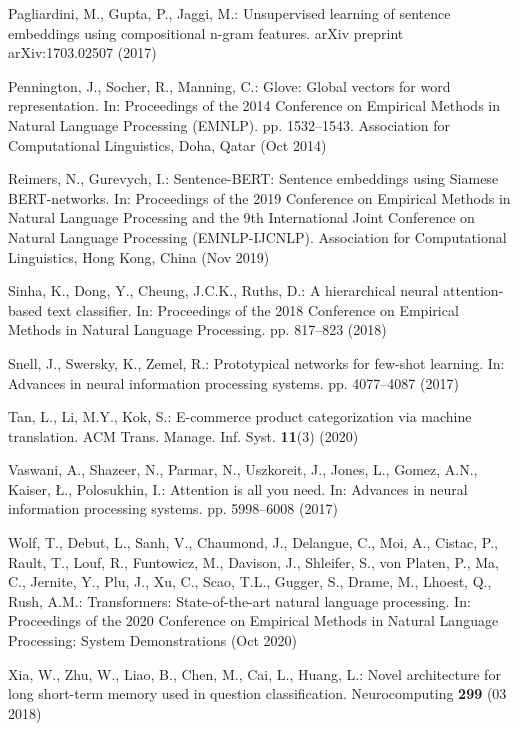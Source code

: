 \documentclass[runningheads, envcountsame, a4paper]{llncs}
\begin{document}
\begin{thebibliography}{10}
Pagliardini, M., Gupta, P., Jaggi, M.: Unsupervised learning of sentence
  embeddings using compositional n-gram features. arXiv preprint
  arXiv:1703.02507  (2017)

Pennington, J., Socher, R., Manning, C.: {G}love: Global vectors for word
  representation. In: Proceedings of the 2014 Conference on Empirical Methods
  in Natural Language Processing ({EMNLP}). pp. 1532--1543. Association for
  Computational Linguistics, Doha, Qatar (Oct 2014)

Reimers, N., Gurevych, I.: Sentence-{BERT}: Sentence embeddings using {S}iamese
  {BERT}-networks. In: Proceedings of the 2019 Conference on Empirical Methods
  in Natural Language Processing and the 9th International Joint Conference on
  Natural Language Processing (EMNLP-IJCNLP). Association for Computational
  Linguistics, Hong Kong, China (Nov 2019)

Sinha, K., Dong, Y., Cheung, J.C.K., Ruths, D.: A hierarchical neural
  attention-based text classifier. In: Proceedings of the 2018 Conference on
  Empirical Methods in Natural Language Processing. pp. 817--823 (2018)

Snell, J., Swersky, K., Zemel, R.: Prototypical networks for few-shot learning.
  In: Advances in neural information processing systems. pp. 4077--4087 (2017)

Tan, L., Li, M.Y., Kok, S.: E-commerce product categorization via machine
  translation. ACM Trans. Manage. Inf. Syst.  \textbf{11}(3) (2020)

Vaswani, A., Shazeer, N., Parmar, N., Uszkoreit, J., Jones, L., Gomez, A.N.,
  Kaiser, {\L}., Polosukhin, I.: Attention is all you need. In: Advances in
  neural information processing systems. pp. 5998--6008 (2017)

Wolf, T., Debut, L., Sanh, V., Chaumond, J., Delangue, C., Moi, A., Cistac, P.,
  Rault, T., Louf, R., Funtowicz, M., Davison, J., Shleifer, S., von Platen,
  P., Ma, C., Jernite, Y., Plu, J., Xu, C., Scao, T.L., Gugger, S., Drame, M.,
  Lhoest, Q., Rush, A.M.: Transformers: State-of-the-art natural language
  processing. In: Proceedings of the 2020 Conference on Empirical Methods in
  Natural Language Processing: System Demonstrations (Oct 2020)

Xia, W., Zhu, W., Liao, B., Chen, M., Cai, L., Huang, L.: Novel architecture
  for long short-term memory used in question classification. Neurocomputing
  \textbf{299} (03 2018)


\end{thebibliography}
\end{document}
